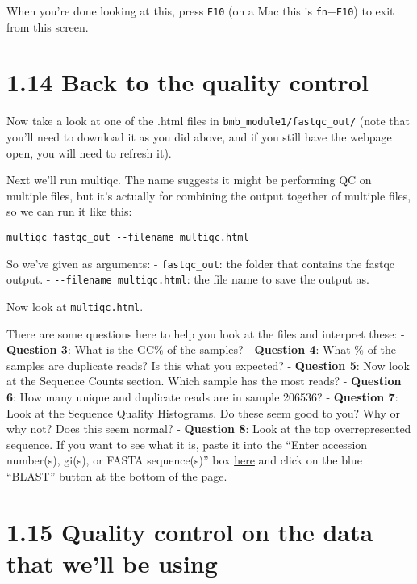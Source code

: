 \documentclass[
]{book}
\begin{document}
When you're done looking at this, press \texttt{F10} (on a Mac this is \texttt{fn}+\texttt{F10}) to exit from this screen.

\section{1.14 Back to the quality control}\label{back-to-the-quality-control}

Now take a look at one of the .html files in \texttt{bmb\_module1/fastqc\_out/} (note that you'll need to download it as you did above, and if you still have the webpage open, you will need to refresh it).

Next we'll run multiqc. The name suggests it might be performing QC on multiple files, but it's actually for combining the output together of multiple files, so we can run it like this:

\begin{verbatim}
multiqc fastqc_out --filename multiqc.html
\end{verbatim}

So we've given as arguments:
- \texttt{fastqc\_out}: the folder that contains the fastqc output.
- \texttt{-\/-filename\ multiqc.html}: the file name to save the output as.

Now look at \texttt{multiqc.html}.

There are some questions here to help you look at the files and interpret these:
- \textbf{Question 3}: What is the GC\% of the samples?
- \textbf{Question 4}: What \% of the samples are duplicate reads? Is this what you expected?
- \textbf{Question 5}: Now look at the Sequence Counts section. Which sample has the most reads?
- \textbf{Question 6}: How many unique and duplicate reads are in sample 206536?
- \textbf{Question 7}: Look at the Sequence Quality Histograms. Do these seem good to you? Why or why not? Does this seem normal?
- \textbf{Question 8}: Look at the top overrepresented sequence. If you want to see what it is, paste it into the ``Enter accession number(s), gi(s), or FASTA sequence(s)'' box \href{https://blast.ncbi.nlm.nih.gov/Blast.cgi?PROGRAM=blastn&PAGE_TYPE=BlastSearch&LINK_LOC=blasthome}{here} and click on the blue ``BLAST'' button at the bottom of the page.\\

\section{1.15 Quality control on the data that we'll be using}\label{quality-control-on-the-data-that-well-be-using}
\end{document}
